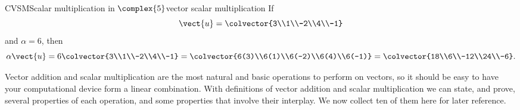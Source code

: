 \begin{example}{CVSM}{Scalar multiplication in $\complex{5}$}{vector scalar multiplication}
If
%
\begin{equation*}
\vect{u}=\colvector{3\\1\\-2\\4\\-1}
\end{equation*}
%
and $\alpha=6$, then
%
\begin{equation*}
\alpha\vect{u}=
6\colvector{3\\1\\-2\\4\\-1}=
\colvector{6(3)\\6(1)\\6(-2)\\6(4)\\6(-1)}=
\colvector{18\\6\\-12\\24\\-6}.
\end{equation*}
%
\end{example}
%
{Vector addition and scalar multiplication are the most natural and basic operations to perform on vectors, so it should be easy to have your computational device form a linear combination.}
{
}{
}
%
%
With definitions of vector addition and scalar multiplication we can state, and prove, several properties of each operation, and some properties that involve their interplay.  We now collect ten of them here for later reference.
